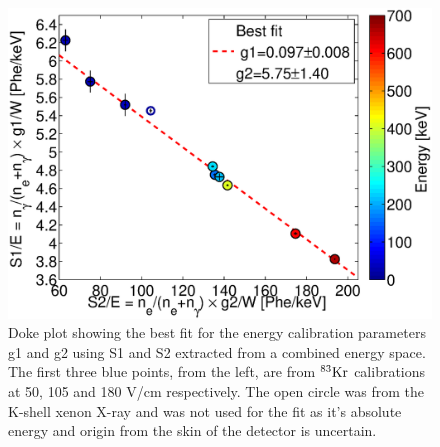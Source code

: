  \begin{figure}[h!]\centering
\includegraphics[width=120mm]{Recombination_LY_QY/Figures/S1S2_Doke_3.eps}
\caption{Doke plot showing the best fit for the energy calibration parameters g1 and g2 using S1 and S2 extracted from a combined energy space. The first three blue points, from the left, are from $\rm^{83}Kr$ calibrations at 50, 105 and 180 V/cm respectively. The open circle was from the K-shell xenon X-ray and was not used for the fit as it's absolute energy and origin from the skin of the detector is uncertain.}
\label{fig:Doke2}
\end{figure}

